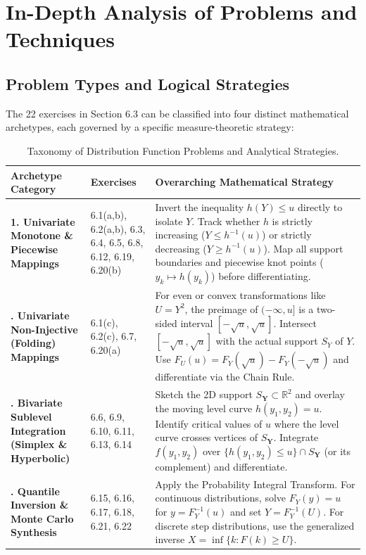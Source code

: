 \documentclass[11pt, letterpaper]{article}
\theoremstyle{definition}
\theoremstyle{remark}
\newcommand{\R}{\mathbb{R}}
\begin{document}
\newpage
\section{In-Depth Analysis of Problems and Techniques}

\subsection{Problem Types and Logical Strategies}

The 22 exercises in Section 6.3 can be classified into four distinct mathematical archetypes, each governed by a specific measure-theoretic strategy:

\renewcommand{\arraystretch}{1.5}
\begin{table}[h!]
\centering
\begin{tabularx}{\textwidth}{>{\bfseries}l l X}
\toprule
Archetype Category & Exercises & Overarching Mathematical Strategy \\
\midrule
1. Univariate Monotone \& Piecewise Mappings & 6.1(a,b), 6.2(a,b), 6.3, 6.4, 6.5, 6.8, 6.12, 6.19, 6.20(b) & Invert the inequality $h(Y) \le u$ directly to isolate $Y$. Track whether $h$ is strictly increasing ($Y \le h^{-1}(u)$) or strictly decreasing ($Y \ge h^{-1}(u)$). Map all support boundaries and piecewise knot points ($y_k \mapsto h(y_k)$) before differentiating. \\
\addlinespace[4pt]
2. Univariate Non-Injective (Folding) Mappings & 6.1(c), 6.2(c), 6.7, 6.20(a) & For even or convex transformations like $U = Y^2$, the preimage of $(-\infty, u]$ is a two-sided interval $[-\sqrt{u}, \sqrt{u}]$. Intersect $[-\sqrt{u}, \sqrt{u}]$ with the actual support $S_Y$ of $Y$. Use $F_U(u) = F_Y(\sqrt{u}) - F_Y(-\sqrt{u})$ and differentiate via the Chain Rule. \\
\addlinespace[4pt]
3. Bivariate Sublevel Integration (Simplex \& Hyperbolic) & 6.6, 6.9, 6.10, 6.11, 6.13, 6.14 & Sketch the 2D support $S_{\mathbf{Y}} \subset \R^2$ and overlay the moving level curve $h(y_1, y_2) = u$. Identify critical values of $u$ where the level curve crosses vertices of $S_{\mathbf{Y}}$. Integrate $f(y_1, y_2)$ over $\{h(y_1, y_2) \le u\} \cap S_{\mathbf{Y}}$ (or its complement) and differentiate. \\
\addlinespace[4pt]
4. Quantile Inversion \& Monte Carlo Synthesis & 6.15, 6.16, 6.17, 6.18, 6.21, 6.22 & Apply the Probability Integral Transform. For continuous distributions, solve $F_Y(y) = u$ for $y = F_Y^{-1}(u)$ and set $Y = F_Y^{-1}(U)$. For discrete step distributions, use the generalized inverse $X = \inf\{k : F(k) \ge U\}$. \\
\bottomrule
\end{tabularx}
\caption{Taxonomy of Distribution Function Problems and Analytical Strategies.}
\end{table}
\end{document}
